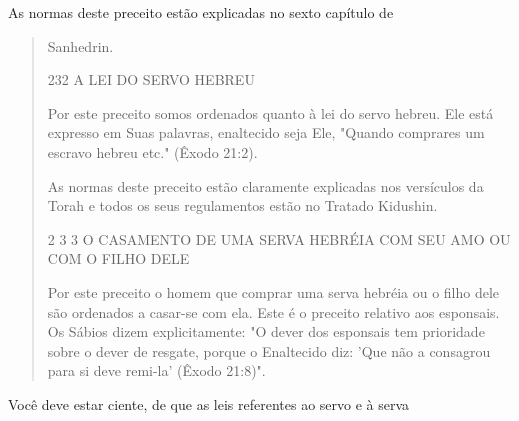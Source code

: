 As normas deste preceito estão explicadas no sexto capítulo de

\begin{quote}
Sanhedrin.

232 A LEI DO SERVO HEBREU

Por este preceito somos ordenados quanto à lei do servo hebreu. Ele está
expresso em Suas palavras, enaltecido seja Ele, "Quando comprares um
escravo hebreu etc." (Êxodo 21:2).

As normas deste preceito estão claramente explicadas nos versícu­los da
Torah e todos os seus regulamentos estão no Tratado Kidushin.

2 3 3 O CASAMENTO DE UMA SERVA HEBRÉIA COM SEU AMO OU COM O FILHO DELE

Por este preceito o homem que comprar uma serva hebréia ou o fi­lho dele
são ordenados a casar-se com ela. Este é o preceito relativo aos
espon­sais. Os Sábios dizem explicitamente: "O dever dos esponsais tem
prioridade sobre o dever de resgate, porque o Enaltecido diz: 'Que não a
consagrou para si deve remi-la' (Êxodo 21:8)".
\end{quote}

Você deve estar ciente, de que as leis referentes ao servo e à serva

